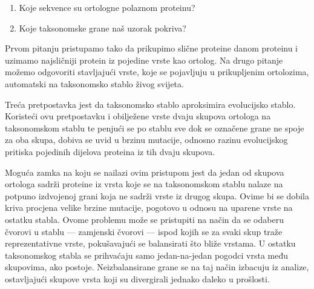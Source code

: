 \begin{enumerate}

    \item Koje sekvence su ortologne polaznom proteinu?

    \item Koje taksonomske grane naš uzorak pokriva?

\end{enumerate}
Prvom pitanju pristupamo tako da prikupimo slične proteine danom proteinu i
uzimamo najsličniji protein iz pojedine vrste kao ortolog. Na drugo pitanje
možemo odgovoriti stavljajući vrste, koje se pojavljuju u prikupljenim
ortolozima, automatski na taksonomsko stablo živog svijeta.

Treća pretpostavka jest da taksonomsko stablo aproksimira evolucijsko stablo.
Koristeći ovu pretpostavku i obilježene vrste dvaju skupova ortologa na
taksonomskom stablu te penjući se po stablu sve dok se označene grane ne spoje
za oba skupa, dobiva se uvid u brzinu mutacije, odnosno razinu evolucijskog
pritiska pojedinih dijelova proteina iz tih dvaju skupova.

Moguća zamka na koju se nailazi ovim pristupom jest da jedan od skupova ortologa
sadrži proteine iz vrsta koje se na taksonomskom stablu nalaze na potpuno
izdvojenoj grani koja ne sadrži vrste iz drugog skupa. Ovime bi se dobila kriva
procjena velike brzine mutacije, pogotovo u odnosu na uparene vrste na ostatku
stabla. Ovome problemu može se pristupiti na način da se odaberu čvorovi u
stablu --- zamjenski čvorovi --- ispod kojih se za svaki skup traže
reprezentativne vrste, pokušavajući se balansirati što bliže vrstama. U ostatku
taksonomskog stabla se prihvaćaju samo jedan-na-jedan pogodci vrsta među
skupovima, ako postoje. Neizbalansirane grane se na taj način izbacuju iz
analize, ostavljajući skupove vrsta koji su divergirali jednako daleko u
prošlosti.

